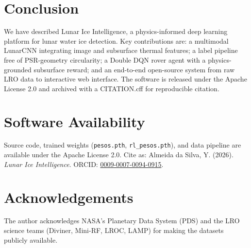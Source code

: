 \documentclass[12pt,a4paper]{article}
\begin{document}
\section{Conclusion}

We have described Lunar Ice Intelligence, a physics-informed deep learning platform
for lunar water ice detection. Key contributions are: a multimodal LunarCNN
integrating image and subsurface thermal features; a label pipeline free of
PSR-geometry circularity; a Double DQN rover agent with a physics-grounded
subsurface reward; and an end-to-end open-source system from raw LRO data to
interactive web interface. The software is released under the Apache License 2.0
and archived with a CITATION.cff for reproducible citation.

\section*{Software Availability}

Source code, trained weights (\texttt{pesos.pth}, \texttt{rl\_pesos.pth}),
and data pipeline are available under the Apache License 2.0.
Cite as: Almeida da Silva, Y. (2026). \textit{Lunar Ice Intelligence}.
ORCID: \href{https://orcid.org/0009-0007-0094-0915}{0009-0007-0094-0915}.

\section*{Acknowledgements}

The author acknowledges NASA's Planetary Data System (PDS) and the LRO science
teams (Diviner, Mini-RF, LROC, LAMP) for making the datasets publicly available.
\end{document}
